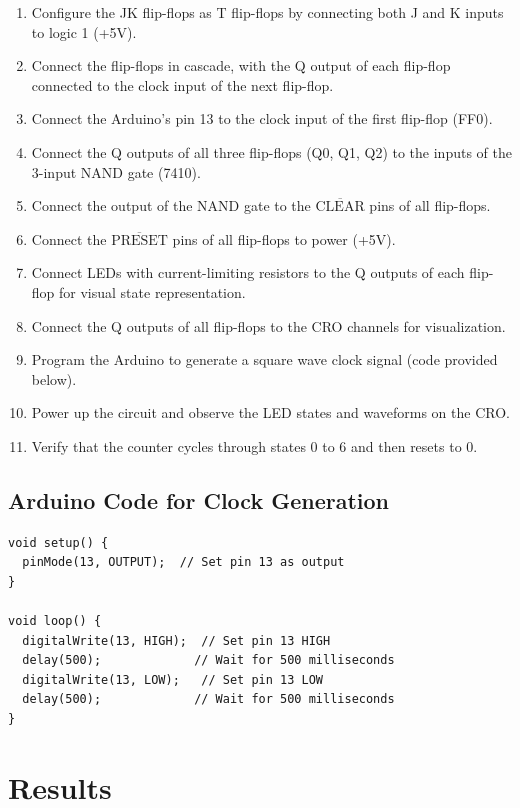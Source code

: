 \documentclass[12pt]{article}
\begin{document}
\begin{enumerate}
    \item Configure the JK flip-flops as T flip-flops by connecting both J and K inputs to logic 1 (+5V).
    \item Connect the flip-flops in cascade, with the Q output of each flip-flop connected to the clock input of the next flip-flop.
    \item Connect the Arduino's pin 13 to the clock input of the first flip-flop (FF0).
    \item Connect the Q outputs of all three flip-flops (Q0, Q1, Q2) to the inputs of the 3-input NAND gate (7410).
    \item Connect the output of the NAND gate to the $\overline{\text{CLEAR}}$ pins of all flip-flops.
    \item Connect the $\overline{\text{PRESET}}$ pins of all flip-flops to power (+5V).
    \item Connect LEDs with current-limiting resistors to the Q outputs of each flip-flop for visual state representation.
    \item Connect the Q outputs of all flip-flops to the CRO channels for visualization.
    \item Program the Arduino to generate a square wave clock signal (code provided below).
    \item Power up the circuit and observe the LED states and waveforms on the CRO.
    \item Verify that the counter cycles through states 0 to 6 and then resets to 0.
\end{enumerate}

\subsection{Arduino Code for Clock Generation}
\begin{verbatim}
void setup() {
  pinMode(13, OUTPUT);  // Set pin 13 as output
}

void loop() {
  digitalWrite(13, HIGH);  // Set pin 13 HIGH
  delay(500);             // Wait for 500 milliseconds
  digitalWrite(13, LOW);   // Set pin 13 LOW
  delay(500);             // Wait for 500 milliseconds
}
\end{verbatim}

\section{Results}
\end{document}
